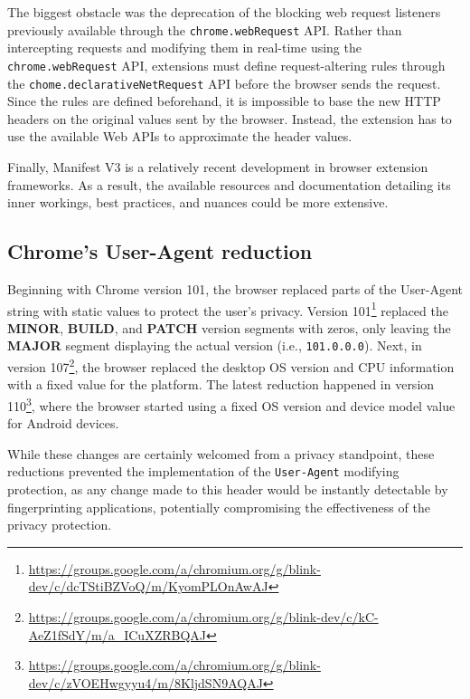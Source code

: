 The biggest obstacle was the deprecation of the blocking web request listeners previously available through the \texttt{chrome.webRequest} API. Rather than intercepting requests and modifying them in real-time using the \texttt{chrome.webRequest} API, extensions must define request-altering rules through the \texttt{chome.declarativeNetRequest} API before the browser sends the request. Since the rules are defined beforehand, it is impossible to base the new HTTP headers on the original values sent by the browser. Instead, the extension has to use the available Web APIs to approximate the header values.


Finally, Manifest V3 is a relatively recent development in browser extension frameworks. As a result, the available resources and documentation detailing its inner workings, best practices, and nuances could be more extensive.

\subsection{Chrome's User-Agent reduction}
\label{SubSection:UserAgentReduction}

Beginning with Chrome version 101, the browser replaced parts of the User-Agent string with static values to protect the user's privacy. Version 101\footnote{\url{https://groups.google.com/a/chromium.org/g/blink-dev/c/dcTStiBZVoQ/m/KyomPLOnAwAJ}} replaced the \textbf{MINOR}, \textbf{BUILD}, and \textbf{PATCH} version segments with zeros, only leaving the \textbf{MAJOR} segment displaying the actual version (i.e., \texttt{101.0.0.0}). Next, in version 107\footnote{\url{https://groups.google.com/a/chromium.org/g/blink-dev/c/kC-AeZ1fSdY/m/a_ICuXZRBQAJ}}, the browser replaced the desktop OS version and CPU information with a fixed value for the platform. The latest reduction happened in version 110\footnote{\url{https://groups.google.com/a/chromium.org/g/blink-dev/c/zVOEHwgyyu4/m/8KljdSN9AQAJ}}, where the browser started using a fixed OS version and device model value for Android devices.

While these changes are certainly welcomed from a privacy standpoint, these reductions prevented the implementation of the \texttt{User-Agent} modifying protection, as any change made to this header would be instantly detectable by fingerprinting applications, potentially compromising the effectiveness of the privacy protection.



% 